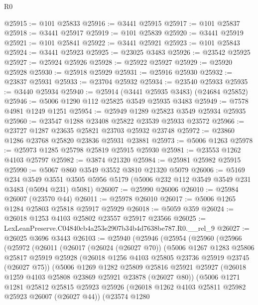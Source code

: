 \begin{lexlean}{R0}
\begin{coremodule}
@25915 := @101 @25833
@25916 := @3441 @25915
@25917 := @101 @25837
@25918 := @3441 @25917
@25919 := @101 @25839
@25920 := @3441 @25919
@25921 := @101 @25841
@25922 := @3441 @25921
@25923 := @101 @25843
@25924 := @3441 @25923
@25925 := @23025 @3483
@25926 := @23542 @25925
@25927 := @25924 @25926
@25928 := @25922 @25927
@25929 := @25920 @25928
@25930 := @25918 @25929
@25931 := @25916 @25930
@25932 := @23837 @25931
@25933 := @23704 @25932
@25934 := @23540 @25933
@25935 := @3440 @25934
@25940 := @25914 (@3441 @25935 @3483) (@24684 @25852)
@25946 := @5006 @1290 @112 @25825 @3549 @25935 @3483
@25949 := @7578 @4981 @1249 @1251
@25954 := @25949 @1289 @25823 @3549 @25934 @25935
@25960 := @23547 @1288 @23408 @25822 @23539 @25933 @23572
@25966 := @23727 @1287 @23635 @25821 @23703 @25932 @23748
@25972 := @23860 @1286 @23768 @25820 @23836 @25931 @23881
@25973 := @5006 @1263
@25978 := @25973 @1285 @25798 @25819 @25915 @25930
@25981 := @23553 @1262 @4103 @25797
@25982 := @3874 @21320
@25984 := @25981 @25982 @25915
@25990 := @5067 @860 @3549 @3552 @3810 @21320 @5079
@26006 := @5169
    @234
    @3549
    @3551
    @3505
    @5956
    @5179
    (@5006 @232 @112 @3549 @3549 @231 @3483 (@5094 @231) @5081)
@26007 := @25990 @26006
@26010 := @25984 @26007 (@23570 @44)
@26011 := @25978 @26010
@26017 := @5006 @1265 @1284 @25803 @25818 @25917 @25929
@26018 := @5059 @359
@26024 := @26018 @1253 @4103 @25802 @23557 @25917 @23566
@26025 := LexLeanPreserve.C04840cb4a253e2907b34b4d7638be787.R0.__rel_9
@26027 := @26025 @3696 @3443
@26103 := @25940
    (@25946
      (@25954
        (@25960
          (@25966
            (@25972
              (@26011
                (@26017
                  (@26024 (@26027 @70))
                  (@5006
                    @1267
                    @1283
                    @25806
                    @25817
                    @25919
                    @25928
                    (@26018 @1256 @4103 @25805 @23736 @25919 @23745 (@26027 @75))
                    (@5006
                      @1269
                      @1282
                      @25809
                      @25816
                      @25921
                      @25927
                      (@26018 @1259 @4103 @25808 @23869 @25921 @23878 (@26027 @80))
                      (@5006
                        @1271
                        @1281
                        @25812
                        @25815
                        @25923
                        @25926
                        (@26018 @1262 @4103 @25811 @25982 @25923 @26007 (@26027 @44))
                        (@23574
                          @1280

\end{coremodule}
\end{lexlean}
